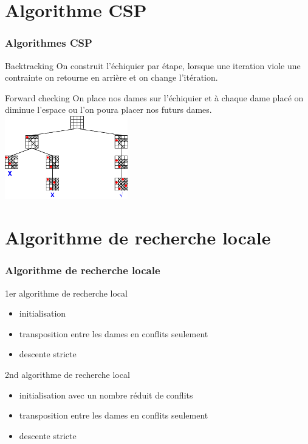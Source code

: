 \documentclass[9pt,a4paper]{beamer}
\begin{document}
\section{Algorithme CSP}
\begin{frame}
	\frametitle{Algorithmes CSP}

	\begin{block}{Backtracking}
		On construit l'échiquier par étape, lorsque une iteration viole une contrainte on retourne en arrière et on change l'itération.
	\end{block}



	\begin{block}{Forward checking}
		On place nos dames sur l'échiquier et à chaque dame placé on diminue l'espace ou l'on poura placer nos futurs dames. \\
		\includegraphics[width=0.4\textwidth]{images/forw.png}
	\end{block}

\end{frame}


\section{Algorithme de recherche locale}
\begin{frame}
	\frametitle{Algorithme de recherche locale}

	\begin{block}{1er algorithme de recherche local}
		\begin{itemize}
			\item{initialisation}
			\item{transposition entre les dames en conflits seulement}
			\item{descente stricte}
		\end{itemize}
	\end{block}

	\begin{block}{2nd algorithme de recherche local}
		\begin{itemize}
		      \item{initialisation avec un nombre réduit de conflits}
		      \item{transposition entre les dames en conflits seulement}
		      \item{descente stricte}
	      \end{itemize}
	\end{block}



\end{frame}
\end{document}
